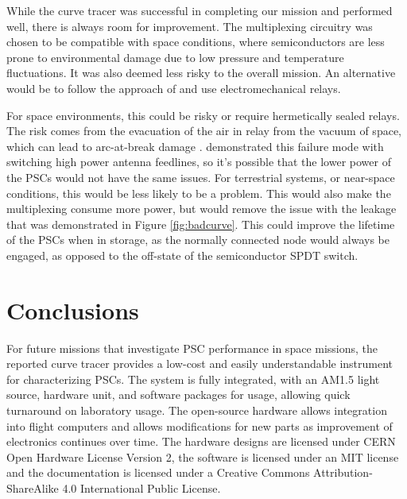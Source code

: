 \documentclass[12pt]{iopart}
\begin{document}
While the curve tracer was successful in completing our mission and performed well, there is always room for improvement.  The multiplexing circuitry was chosen to be compatible with space conditions, where semiconductors are less prone to environmental damage due to low pressure and temperature fluctuations.  It was also deemed less risky to the overall mission.  An alternative would be to follow the approach of \cite{lopez2021design, pulungan2022design} and use electromechanical relays.  

For space environments, this could be risky or require hermetically sealed relays.  The risk comes from the evacuation of the air in relay from the vacuum of space, which can lead to arc-at-break damage \cite{teverovsky1999relay}.  \cite{teverovsky1999relay} demonstrated this failure mode with switching high power antenna feedlines, so it's possible that the lower power of the PSCs would not have the same issues.  For terrestrial systems, or near-space conditions, this would be less likely to be a problem.  This would also make the multiplexing consume more power, but would remove the issue with the leakage that was demonstrated in Figure \ref{fig:badcurve}.  This could improve the lifetime of the PSCs when in storage, as the normally connected node would always be engaged, as opposed to the off-state of the semiconductor SPDT switch.

\section*{Conclusions}

For future missions that investigate PSC performance in space missions, the reported curve tracer provides a low-cost and easily understandable instrument for characterizing PSCs.  The system is fully integrated, with an AM1.5 light source, hardware unit, and software packages for usage, allowing quick turnaround on laboratory usage.  The open-source hardware allows integration into flight computers and allows modifications for new parts as improvement of electronics continues over time.  The hardware designs are licensed under CERN Open Hardware License Version 2, the software is licensed under an MIT license and the documentation is licensed under a Creative Commons Attribution-ShareAlike 4.0 International Public License.




\printbibliography %
\end{document}
